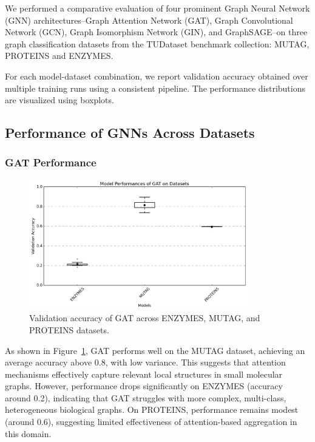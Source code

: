 \documentclass[11pt,a4paper]{article}
\begin{document}
	We performed a comparative evaluation of four prominent Graph Neural Network (GNN) architectures--Graph Attention Network (GAT), Graph Convolutional Network (GCN), Graph Isomorphism Network (GIN), and GraphSAGE--on three graph classification datasets from the TUDataset benchmark collection: MUTAG, PROTEINS and ENZYMES.
	
	For each model-dataset combination, we report validation accuracy obtained over multiple training runs using a consistent pipeline. The performance distributions are visualized using boxplots.
	
	\subsection{Performance of GNNs Across Datasets}
	
	\subsubsection*{GAT Performance}
	
	\begin{figure}[h]
		\centering
		\includegraphics[width=0.85\textwidth]{boxplot_GAT.png}
		\caption{Validation accuracy of GAT across ENZYMES, MUTAG, and PROTEINS datasets.}
		\label{fig:gat}
	\end{figure}
	
	As shown in Figure~\ref{fig:gat}, GAT performs well on the MUTAG dataset, achieving an average accuracy above 0.8, with low variance. This suggests that attention mechanisms effectively capture relevant local structures in small molecular graphs. However, performance drops significantly on ENZYMES (accuracy around 0.2), indicating that GAT struggles with more complex, multi-class, heterogeneous biological graphs. On PROTEINS, performance remains modest (around 0.6), suggesting limited effectiveness of attention-based aggregation in this domain.
	
\end{document}
